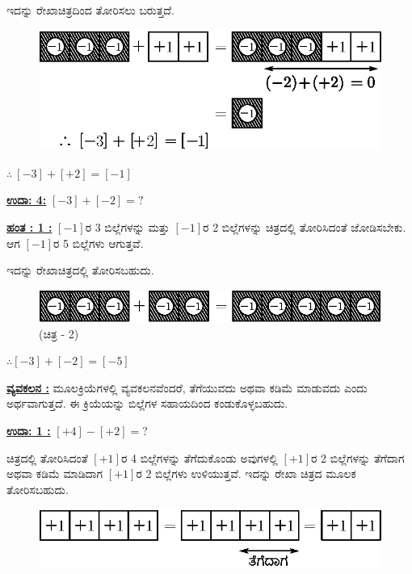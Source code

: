 ಇದನ್ನು ರೇಖಾಚಿತ್ರದಿಂದ ತೋರಿಸಲು ಬರುತ್ತದೆ.
\begin{figure}[H]
\centering
\includegraphics[scale=0.8]{src/figure/chap3/fig3-10b.eps}
\end{figure}
$\therefore \ [-3]+[+2]=[-1]$

\noindent
{\textbf{\underline{ಉದಾ: 4:}}} $[-3] + [-2] = ?$

\noindent
{\textbf{\underline{ಹಂತ : 1 :}}} $[-1]$ರ 3 ಬಿಲ್ಲೆಗಳನ್ನು ಮತ್ತು $[-1]$ರ 2 ಬಿಲ್ಲೆಗಳನ್ನು ಚಿತ್ರದಲ್ಲಿ ತೋರಿಸಿದಂತೆ ಜೋಡಿಸಬೇಕು. ಆಗ $[-1]$ರ 5 ಬಿಲ್ಲೆಗಳು ಆಗುತ್ತವೆ.


ಇದನ್ನು ರೇಖಾಚಿತ್ರದಲ್ಲಿ ತೋರಿಸಬಹುದು.
\begin{figure}[H]
\centering
\includegraphics{src/figure/chap3/fig3-11b.eps}
(ಚಿತ್ರ - 2)
\end{figure}

$\therefore [-3] + [-2] = [-5]$


\noindent
\medskip
{\textbf{\underline{ವ್ಯವಕಲನ :}}} ಮೂಲಕ್ರಿಯೆಗಳಲ್ಲಿ ವ್ಯವಕಲನವೆಂದರೆ, ತೆಗೆಯುವದು ಅಥವಾ ಕಡಿಮೆ ಮಾಡು\-ವದು ಎಂದು ಅರ್ಥವಾಗುತ್ತದೆ. ಈ ಕ್ರಿಯೆಯನ್ನು ಬಿಲ್ಲೆಗಳ ಸಹಾಯದಿಂದ ಕಂಡುಕೊಳ್ಳ\break ಬಹುದು.

\noindent
{\textbf{\underline{ಉದಾ: 1 :}}} $[+4] - [+2] = ?$

ಚಿತ್ರದಲ್ಲಿ ತೋರಿಸಿದಂತೆ $[+1]$ರ 4 ಬಿಲ್ಲೆಗಳನ್ನು ತೆಗೆದುಕೊಂಡು ಅವುಗಳಲ್ಲಿ $[+1]$ರ 2 ಬಿಲ್ಲೆಗಳನ್ನು ತೆಗೆದಾಗ ಅಥವಾ ಕಡಿಮೆ ಮಾಡಿದಾಗ $[+1]$ರ 2 ಬಿಲ್ಲೆಗಳು ಉಳಿಯುತ್ತವೆ. ಇದನ್ನು  ರೇಖಾ ಚಿತ್ರದ ಮೂಲಕ ತೋರಿಸಬಹುದು.
\begin{figure}[H]
\centering
\includegraphics{src/figure/chap3/fig3-12b.eps}
\end{figure}

